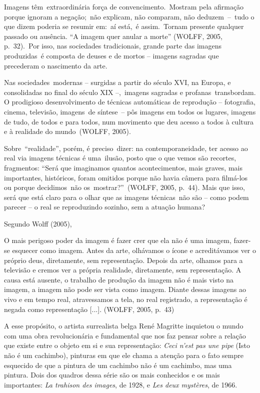 \documentclass[
  letterpaper,
  a4paper,
  12pt]{scrbook}
\renewenvironment{quote}
  {\par\singlespacing\small\list{}{\rightmargin=0cm \leftmargin=4cm}%
   \item\relax}
  {\endlist}
\begin{document}
Imagens têm~extraordinária força de convencimento.~Mostram pela
afirmação porque ignoram a negação;~não explicam, não comparam, não
deduzem~--~tudo o que dizem poderia se resumir em:~aí está,~é
assim.~Tornam presente qualquer passado ou ausência. ``A imagem quer
anular a morte'' (WOLFF, 2005, p.~32).~Por isso, nas sociedades
tradicionais, grande parte das imagens produzidas~é composta de deuses e
de mortos -- imagens sagradas que precederam o nascimento da arte.~

Nas sociedades~modernas -- surgidas a partir do século XVI, na Europa, e
consolidadas no final do século XIX --,~imagens sagradas e
profanas~transbordam. O prodigioso desenvolvimento de técnicas
automáticas de reprodução -- fotografia, cinema, televisão, imagens~de
síntese~-- pôs imagens em todos os lugares, imagens de tudo, de todos e
para todos, num movimento que deu acesso a todos à cultura e à realidade
do mundo~(WOLFF, 2005).

Sobre~``realidade'', porém, é preciso~dizer: na contemporaneidade, ter
acesso ao real via imagens técnicas é uma~ilusão, posto que o que vemos
são recortes, fragmentos: ``Será que imaginamos quantos acontecimentos,
mais graves, mais importantes, históricos, foram omitidos porque não
havia câmera para filmá-los ou porque decidimos~não
os~mostrar?''~(WOLFF, 2005, p.~44). Mais que isso, será que está claro
para o olhar que as imagens técnicas~não são -- como podem parecer -- o
real se reproduzindo sozinho, sem a atuação humana? ~

Segundo Wolff (2005),~

\begin{quote}
O mais perigoso poder da imagem é fazer crer que ela não é uma imagem,
fazer-se esquecer como imagem. Antes da arte, olhávamos o ícone e
acreditávamos ver o próprio deus, diretamente, sem representação. Depois
da arte, olhamos para a televisão e cremos ver a própria realidade,
diretamente, sem representação. A causa está ausente, o trabalho de
produção da imagem não é mais visto na imagem, a imagem não pode ser
vista como imagem. Diante dessas imagens ao vivo e em tempo real,
atravessamos a tela, no real registrado, a representação é negada como
representação {[}...{]}. (WOLFF, 2005, p.~43)~
\end{quote}

A esse propósito, o artista surrealista belga René Magritte inquietou o
mundo com uma obra revolucionária e fundamental que nos faz pensar sobre
a relação que existe entre o objeto em si e sua representação:
\emph{Ceci n'est pas une pipe} (Isto não é um cachimbo), pinturas em que
ele chama a atenção para o fato sempre esquecido de que a pintura de um
cachimbo não é um cachimbo, mas uma pintura. Dois dos quadros dessa
série são os mais conhecidos e os mais importantes: \emph{La trahison
des images}, de 1928, e \emph{Les deux mystères}, de 1966.
\end{document}
